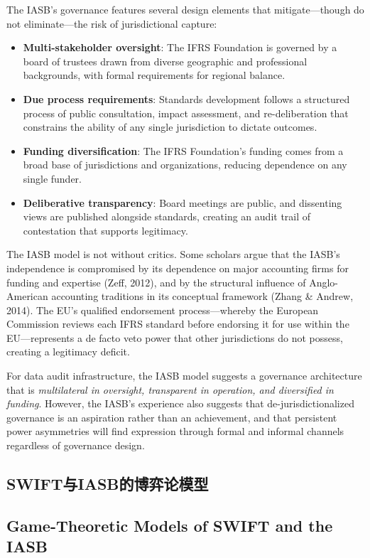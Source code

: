 \documentclass[12pt,a4paper]{ctexart}
\theoremstyle{definition}
\theoremstyle{remark}
\begin{document}
The IASB's governance features several design elements that mitigate—though do not eliminate—the risk of jurisdictional capture:
\begin{itemize}
\item \textbf{Multi-stakeholder oversight}: The IFRS Foundation is governed by a board of trustees drawn from diverse geographic and professional backgrounds, with formal requirements for regional balance.
\item \textbf{Due process requirements}: Standards development follows a structured process of public consultation, impact assessment, and re-deliberation that constrains the ability of any single jurisdiction to dictate outcomes.
\item \textbf{Funding diversification}: The IFRS Foundation's funding comes from a broad base of jurisdictions and organizations, reducing dependence on any single funder.
\item \textbf{Deliberative transparency}: Board meetings are public, and dissenting views are published alongside standards, creating an audit trail of contestation that supports legitimacy.
\end{itemize}

The IASB model is not without critics. Some scholars argue that the IASB's independence is compromised by its dependence on major accounting firms for funding and expertise (Zeff, 2012), and by the structural influence of Anglo-American accounting traditions in its conceptual framework (Zhang \& Andrew, 2014). The EU's qualified endorsement process—whereby the European Commission reviews each IFRS standard before endorsing it for use within the EU—represents a de facto veto power that other jurisdictions do not possess, creating a legitimacy deficit.

For data audit infrastructure, the IASB model suggests a governance architecture that is \textit{multilateral in oversight, transparent in operation, and diversified in funding}. However, the IASB's experience also suggests that de-jurisdictionalized governance is an aspiration rather than an achievement, and that persistent power asymmetries will find expression through formal and informal channels regardless of governance design.

\subsection{SWIFT与IASB的博弈论模型}

\subsection{Game-Theoretic Models of SWIFT and the IASB}
\end{document}
